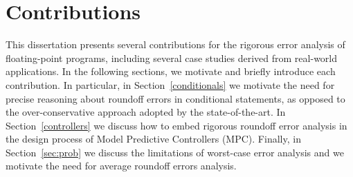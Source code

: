 %
%
%
%
\section{Contributions}
%
This dissertation presents several contributions for the rigorous error analysis of floating-point programs, including several case studies derived from real-world applications.
%
%
%
In the following sections, we motivate and briefly introduce each contribution.
%
In particular, in Section~\ref{conditionals} we motivate the need for precise reasoning about roundoff errors in conditional statements, as opposed to the over-conservative approach adopted by the state-of-the-art.
%
In Section~\ref{controllers} we discuss how to embed rigorous roundoff error analysis in the design process of Model Predictive Controllers (MPC).
%
Finally, in Section~\ref{sec:prob} we discuss the limitations of worst-case error analysis and we motivate the need for average roundoff errors analysis. 
%
%
%

